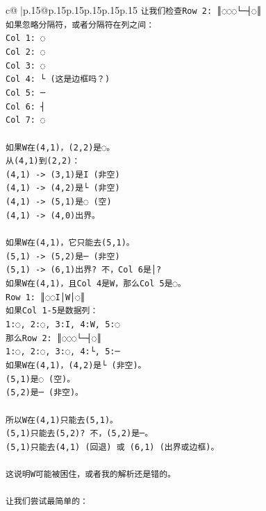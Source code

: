 \documentclass{article}
\begin{document}
{\begin{supertabular}{c@{$\;$}|p{.15\linewidth}@{}p{.15\linewidth}p{.15\linewidth}p{.15\linewidth}p{.15\linewidth}p{.15\linewidth}}
{{{\texttt{让我们检查Row 2: ║◌◌◌└─┤◌║} \\
\texttt{如果忽略分隔符，或者分隔符在列之间：} \\
\texttt{Col 1: ◌} \\
\texttt{Col 2: ◌} \\
\texttt{Col 3: ◌} \\
\texttt{Col 4: └ (这是边框吗？)} \\
\texttt{Col 5: ─} \\
\texttt{Col 6: ┤} \\
\texttt{Col 7: ◌} \\
\\ 
\texttt{如果W在(4,1)，(2,2)是◌。} \\
\texttt{从(4,1)到(2,2)：} \\
\texttt{(4,1) {-}> (3,1)是I (非空)} \\
\texttt{(4,1) {-}> (4,2)是└ (非空)} \\
\texttt{(4,1) {-}> (5,1)是◌ (空)} \\
\texttt{(4,1) {-}> (4,0)出界。} \\
\\ 
\texttt{如果W在(4,1)，它只能去(5,1)。} \\
\texttt{(5,1) {-}> (5,2)是─ (非空)} \\
\texttt{(5,1) {-}> (6,1)出界? 不，Col 6是│?} \\
\texttt{如果W在(4,1)，且Col 4是W，那么Col 5是◌。} \\
\texttt{Row 1: ║◌◌I│W│◌║} \\
\texttt{如果Col 1{-}5是数据列：} \\
\texttt{1:◌, 2:◌, 3:I, 4:W, 5:◌} \\
\texttt{那么Row 2: ║◌◌◌└─┤◌║} \\
\texttt{1:◌, 2:◌, 3:◌, 4:└, 5:─} \\
\texttt{如果W在(4,1)，(4,2)是└ (非空)。} \\
\texttt{(5,1)是◌ (空)。} \\
\texttt{(5,2)是─ (非空)。} \\
\\ 
\texttt{所以W在(4,1)只能去(5,1)。} \\
\texttt{(5,1)只能去(5,2)? 不，(5,2)是─。} \\
\texttt{(5,1)只能去(4,1) (回退) 或 (6,1) (出界或边框)。} \\
\\ 
\texttt{这说明W可能被困住，或者我的解析还是错的。} \\
\\ 
\texttt{让我们尝试最简单的：} \\
}}}
\end{supertabular}}
\end{document}
